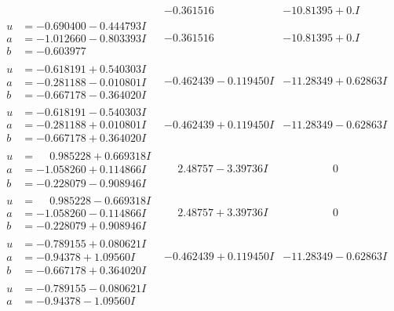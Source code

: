 \documentclass[1p]{elsarticle_modified}
\theoremstyle{definition}
\begin{document}
$$\begin{array}{c|c|c}
 & -0.361516\phantom{ +0.000000I} & -10.81395 + 0. I\phantom{ +0.000000I} \\ \hline\begin{aligned}
u &= -0.690400 - 0.444793 I \\
a &= -1.012660 - 0.803393 I \\
b &= -0.603977\phantom{ +0.000000I}\end{aligned}
 & -0.361516\phantom{ +0.000000I} & -10.81395 + 0. I\phantom{ +0.000000I} \\ \hline\begin{aligned}
u &= -0.618191 + 0.540303 I \\
a &= -0.281188 - 0.010801 I \\
b &= -0.667178 - 0.364020 I\end{aligned}
 & -0.462439 - 0.119450 I & -11.28349 + 0.62863 I \\ \hline\begin{aligned}
u &= -0.618191 - 0.540303 I \\
a &= -0.281188 + 0.010801 I \\
b &= -0.667178 + 0.364020 I\end{aligned}
 & -0.462439 + 0.119450 I & -11.28349 - 0.62863 I \\ \hline\begin{aligned}
u &= \phantom{-}0.985228 + 0.669318 I \\
a &= -1.058260 + 0.114866 I \\
b &= -0.228079 - 0.908946 I\end{aligned}
 & \phantom{-}2.48757 - 3.39736 I & \phantom{-0.000000 } 0 \\ \hline\begin{aligned}
u &= \phantom{-}0.985228 - 0.669318 I \\
a &= -1.058260 - 0.114866 I \\
b &= -0.228079 + 0.908946 I\end{aligned}
 & \phantom{-}2.48757 + 3.39736 I & \phantom{-0.000000 } 0 \\ \hline\begin{aligned}
u &= -0.789155 + 0.080621 I \\
a &= -0.94378 + 1.09560 I \\
b &= -0.667178 + 0.364020 I\end{aligned}
 & -0.462439 + 0.119450 I & -11.28349 - 0.62863 I \\ \hline\begin{aligned}
u &= -0.789155 - 0.080621 I \\
a &= -0.94378 - 1.09560 I \\

\end{aligned}
\end{array}$$
\end{document}
